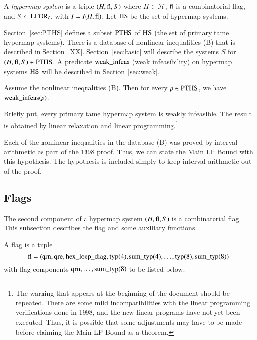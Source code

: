 \begin{definition}
A {\it hypermap system} is a triple $(H,{\operatorname{fl}},S)$ where
    $H\in {\mathcal H}$,
    ${\operatorname{fl}}$ is a
    combinatorial flag,
    and $S\subset {\operatorname{LFOR}}_I$, with $I = I(H,{\operatorname{fl}})$.
    Let ${\operatorname{HS}}$ be the set of hypermap systems.
\end{definition}

Section~\ref{sec:PTHS} defines a subset ${\operatorname{PTHS}}$ of ${\operatorname{HS}}$
(the set of primary tame hypermap systems).  There is a database
of nonlinear inequalities (B) that is described in
Section~\ref{XX}. Section~\ref{sec:basic} will describe the
systems $S$ for $(H,{\operatorname{fl}},S)\in{\operatorname{PTHS}}$.  A predicate
${\operatorname{weak\_infeas}}$ (weak infeasibility) on hypermap systems
${\operatorname{HS}}$ will be described in Section~\ref{sec:weak}.

\begin{theorem}\label{thm:lpbound} Assume the nonlinear
inequalities (B).  Then for every $\rho\in {\operatorname{PTHS}}$, we have
${\operatorname{weak\_infeas}}(\rho)$.
\end{theorem}

Briefly put, every primary tame hypermap system is weakly
infeasible.  The result is obtained by linear relaxation and
linear programming.\footnote{The warning that appears at the
beginning of the document should be repeated.  There are some mild
incompatibilities with the linear programming verifications done
in 1998, and the new linear programs have not yet been executed.
Thus, it is possible that some adjustments may have to be made
before claiming the Main LP Bound as a theorem.}

\begin{remark}  Each of the nonlinear inequalities in the database
(B) was proved by interval arithmetic as part of the 1998 proof.
Thus, we can state the Main LP Bound with this hypothesis.  The
hypothesis is included simply to keep interval arithmetic out of
the proof.
\end{remark}

\subsection{Flags}
\label{sec:flag}

The second component of a  hypermap system $(H,{\operatorname{fl}},S)$ is a
combinatorial flag.  This subsection describes the flag and some
auxiliary functions.

\begin{definition}
 A flag is a tuple
    $$
    {\operatorname{fl}}=({\operatorname{qrn}},{\operatorname{qre}},{\operatorname{hex\_loop\_diag}},
    {\operatorname{typ}}(4),{\operatorname{sum\_typ}}(4),\ldots,
    {\operatorname{typ}}(8),{\operatorname{sum\_typ}}(8))
    $$
 with flag components ${\operatorname{qrn}},\ldots,{\operatorname{sum\_typ}}(8)$ to be listed below.
 \end{definition}

